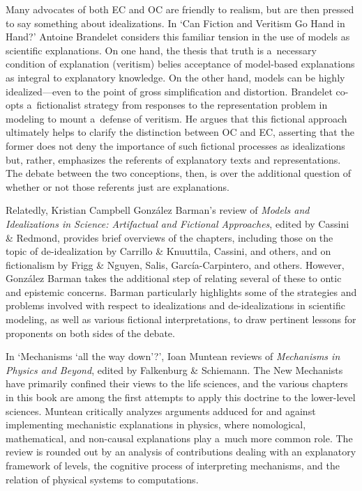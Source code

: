 Many advocates of both EC and OC are friendly to realism, but are then pressed to say something about idealizations. In ‘Can Fiction and Veritism Go Hand in Hand?' Antoine Brandelet considers this familiar tension in the use of models as scientific explanations. On one hand, the thesis that truth is a~necessary condition of explanation (veritism) belies acceptance of model-based explanations as integral to explanatory knowledge. On the other hand, models can be highly idealized---even to the point of gross simplification and distortion. Brandelet co-opts a~fictionalist strategy from responses to the representation problem in modeling to mount a~defense of veritism. He argues that this fictional approach ultimately helps to clarify the distinction between OC and EC, asserting that the former does not deny the importance of such fictional processes as idealizations but, rather, emphasizes the referents of explanatory texts and representations. The debate between the two conceptions, then, is over the additional question of whether or not those referents just are explanations.

Relatedly, Kristian Campbell González Barman's review of \textit{Models and Idealizations in Science: Artifactual and Fictional Approaches}, edited by Cassini \& Redmond, provides brief overviews of the chapters, including those on the topic of de-idealization by Carrillo \& Knuuttila, Cassini, and others, and on fictionalism by Frigg \& Nguyen, Salis, García-Carpintero, and others. However, González Barman takes the additional step of relating several of these to ontic and epistemic concerns. Barman particularly highlights some of the strategies and problems involved with respect to idealizations and de-idealizations in scientific modeling, as well as various fictional interpretations, to draw pertinent lessons for proponents on both sides of the debate.

In ‘Mechanisms ‘all the way down'?', Ioan Muntean reviews of \textit{Mechanisms in Physics and Beyond}, edited by Falkenburg \& Schiemann. The New Mechanists have primarily confined their views to the life sciences, and the various chapters in this book are among the first attempts to apply this doctrine to the lower-level sciences. Muntean critically analyzes arguments adduced for and against implementing mechanistic explanations in physics, where nomological, mathematical, and non-causal explanations play a~much more common role. The review is rounded out by an analysis of contributions dealing with an explanatory framework of levels, the cognitive process of interpreting mechanisms, and the relation of physical systems to computations.

